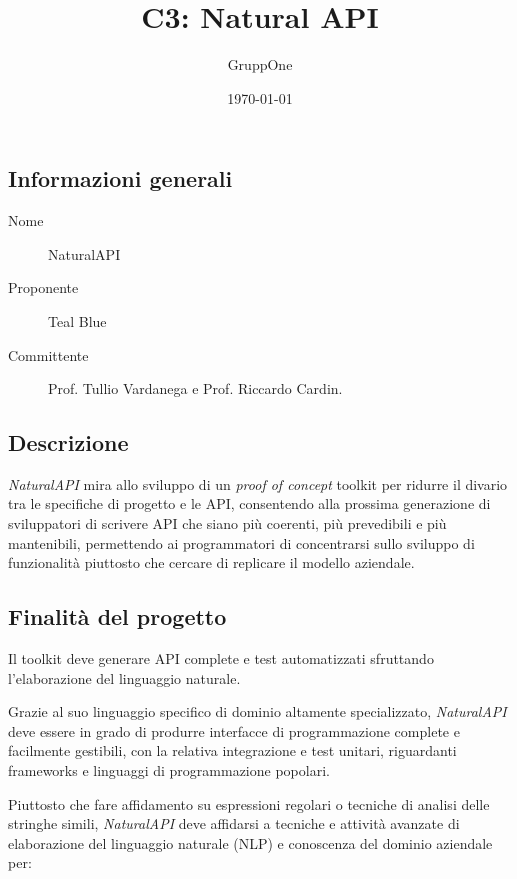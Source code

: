\documentclass[../studio-di-fattibilita.tex]{subfiles}
\title{C3: Natural API}
\author{GruppOne}
\date{\today}
\begin{document}
  \subsection{Informazioni generali} \label{sec:informazioni_generali}

  \begin{description}
    \item[Nome] NaturalAPI
    \item[Proponente] Teal Blue
    \item[Committente] Prof. Tullio Vardanega e Prof. Riccardo Cardin.
  \end{description}



  \subsection{Descrizione} \label{sec:descrizione}

    \textit{NaturalAPI} mira allo sviluppo di un \textit{proof of concept} toolkit
    per ridurre il divario tra le specifiche di progetto e le API, consentendo
    alla prossima generazione di sviluppatori di scrivere API che siano più
    coerenti, più prevedibili e più mantenibili, permettendo ai programmatori
    di concentrarsi sullo sviluppo di funzionalità piuttosto che cercare di
    replicare il modello aziendale.



  \subsection{Finalità del progetto} \label{sec:finalità_del_progetto}
    Il toolkit deve generare API complete e test automatizzati sfruttando l'elaborazione
    del linguaggio naturale.

    Grazie al suo linguaggio specifico di dominio altamente specializzato, \textit{NaturalAPI}
    deve essere in grado di produrre interfacce di programmazione complete e facilmente gestibili,
    con la relativa integrazione e test unitari, riguardanti frameworks e linguaggi di
    programmazione popolari.

    Piuttosto che fare affidamento su espressioni regolari o tecniche di analisi delle
    stringhe simili, \textit{NaturalAPI} deve affidarsi a tecniche e attività avanzate di
    elaborazione del linguaggio naturale (NLP) e conoscenza del dominio aziendale per:
\end{document}
